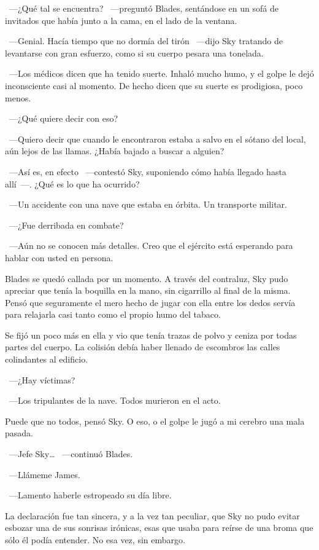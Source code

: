 ~---¿Qué tal se encuentra? ~---preguntó Blades, sentándose en un sofá de invitados que había junto a la cama, en el lado de la ventana.

~---Genial. Hacía tiempo que no dormía del tirón ~---dijo Sky tratando de levantarse con gran esfuerzo, como si su cuerpo pesara una tonelada.

~---Los médicos dicen que ha tenido suerte. Inhaló mucho humo, y el golpe le dejó inconsciente casi al momento. De hecho dicen que su suerte es prodigiosa, poco menos.

~---¿Qué quiere decir con eso?

~---Quiero decir que cuando le encontraron estaba a salvo en el sótano del local, aún lejos de las llamas. ¿Había bajado a buscar a alguien?

~---Así es, en efecto ~---contestó Sky, suponiendo cómo había llegado hasta allí~---. ¿Qué es lo que ha ocurrido?

~---Un accidente con una nave que estaba en órbita. Un transporte militar.

~---¿Fue derribada en combate?

~---Aún no se conocen más detalles. Creo que el ejército está esperando para hablar con usted en persona.

Blades se quedó callada por un momento. A través del contraluz, Sky pudo apreciar que tenía la boquilla en la mano, sin cigarrillo al final de la misma. Pensó que seguramente el mero hecho de jugar con ella entre los dedos servía para relajarla casi tanto como el propio humo del tabaco.

Se fijó un poco más en ella y vio que tenía trazas de polvo y ceniza por todas partes del cuerpo. La colisión debía haber llenado de escombros las calles colindantes al edificio.

~---¿Hay víctimas?

~---Los tripulantes de la nave. Todos murieron en el acto.

Puede que no todos, pensó Sky. O eso, o el golpe le jugó a mi cerebro una mala pasada.

~---Jefe Sky\dots{} ~---continuó Blades.

~---Llámeme James.

~---Lamento haberle estropeado su día libre.

La declaración fue tan sincera, y a la vez tan peculiar, que Sky no pudo evitar esbozar una de sus sonrisas irónicas, esas que usaba para reírse de una broma que sólo él podía entender. No esa vez, sin embargo.

